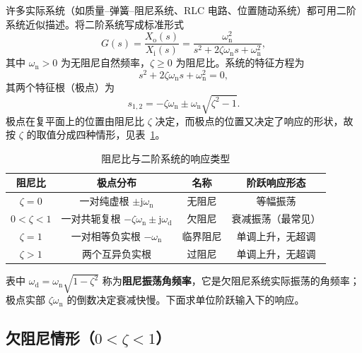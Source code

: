 许多实际系统（如质量--弹簧--阻尼系统、RLC 电路、位置随动系统）都可用二阶系统近似描述。将二阶系统写成标准形式
\begin{equation}
G(s)=\frac{X_{\mathrm{o}}(s)}{X_{\mathrm{i}}(s)}
=\frac{\omega_{\mathrm{n}}^{2}}{s^{2}+2\zeta\omega_{\mathrm{n}}s+\omega_{\mathrm{n}}^{2}},
\label{eq:二阶系统标准形式}
\end{equation}
其中 $\omega_{\mathrm{n}}>0$ 为无阻尼自然频率，$\zeta\ge 0$ 为阻尼比。系统的特征方程为
\begin{equation}
s^{2}+2\zeta\omega_{\mathrm{n}}s+\omega_{\mathrm{n}}^{2}=0,
\label{eq:二阶特征方程}
\end{equation}
其两个特征根（极点）为
\begin{equation}
s_{1,2}=-\zeta\omega_{\mathrm{n}}\pm\omega_{\mathrm{n}}\sqrt{\zeta^{2}-1}.
\label{eq:二阶极点}
\end{equation}
极点在复平面上的位置由阻尼比 $\zeta$ 决定，而极点的位置又决定了响应的形状，故按 $\zeta$ 的取值分成四种情形，见表~\ref{tab:阻尼比与响应类型}。

\begin{table}[H]
\centering
\caption{阻尼比与二阶系统的响应类型}
\label{tab:阻尼比与响应类型}
\renewcommand{\arraystretch}{1.5}
\begin{tabular}{cccc}
\toprule
阻尼比 & 极点分布 & 名称 & 阶跃响应形态 \\
\midrule
$\zeta=0$ & 一对纯虚根 $\pm\mathrm{j}\omega_{\mathrm{n}}$ & 无阻尼 & 等幅振荡 \\
$0<\zeta<1$ & 一对共轭复根 $-\zeta\omega_{\mathrm{n}}\pm\mathrm{j}\omega_{\mathrm{d}}$ & 欠阻尼 & 衰减振荡（最常见） \\
$\zeta=1$ & 一对相等负实根 $-\omega_{\mathrm{n}}$ & 临界阻尼 & 单调上升，无超调 \\
$\zeta>1$ & 两个互异负实根 & 过阻尼 & 单调上升，无超调 \\
\bottomrule
\end{tabular}
\end{table}

表中 $\omega_{\mathrm{d}}=\omega_{\mathrm{n}}\sqrt{1-\zeta^{2}}$ 称为\textbf{阻尼振荡角频率}，它是欠阻尼系统实际振荡的角频率；极点实部 $\zeta\omega_{\mathrm{n}}$ 的倒数决定衰减快慢。下面求单位阶跃输入下的响应。

\subsection{欠阻尼情形（$0<\zeta<1$）}
\label{sec:二阶欠阻尼}

